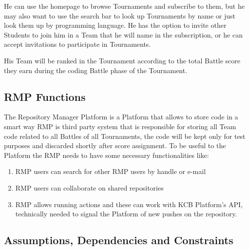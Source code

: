 He can use the homepage to browse Tournaments and subscribe to them, but he may also want to use the search bar to look up Tournaments by name or just look them up by programming language. He has the option to invite other Students
to join him in a Team that he will name in the subscription, or he can accept invitations to participate in Tournaments.

His Team will be ranked in the Tournament according to the total Battle score they earn during the coding Battle phase of the Tournament.

\subsection{RMP Functions}
The Repository Manager Platform is a Platform that allows to store code in a smart way
RMP is third party system that is responsible for storing all Team code related to all Battles of all Tournaments, the code will be kept only for test purposes and discarded shortly after score assignment. 
To be useful to the Platform the RMP needs to have some necessary functionalities like:
\begin{enumerate}
    \item RMP users can search for other RMP users by handle or e-mail
    \item RMP users can collaborate on shared repositories
    \item RMP allows running actions and these can work with KCB Platform's API, technically needed to signal the Platform of new pushes on the repository.
\end{enumerate}

\subsection{Assumptions, Dependencies and Constraints}
